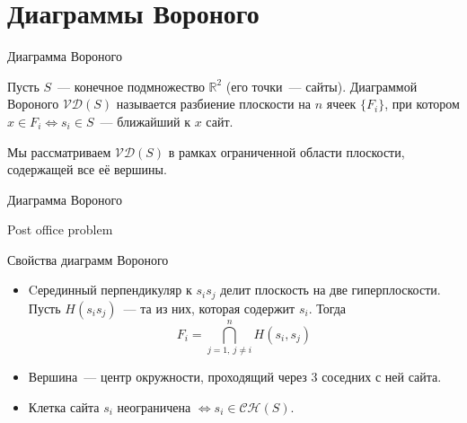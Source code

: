 \section{Диаграммы Вороного}

    \begin{frame}{Диаграмма Вороного}

        \begin{defn}

            Пусть $S$~--- конечное подмножество $\mathbb{R}^2$ (его точки~--- \alert{сайты}).
            Диаграммой Вороного $\mathcal{V}\mathcal{D}(S)$ называется разбиение плоскости на $n$ ячеек $\{ F_i \}$, при котором $x \in F_i
            \Leftrightarrow s_i \in S$~--- ближайший к $x$ \alert{сайт}.

        \end{defn}

        Мы рассматриваем $\mathcal{V}\mathcal{D}(S)$ в рамках ограниченной области плоскости, содержащей все её
        вершины.

    \end{frame}

    \begin{frame}{Диаграмма Вороного}
        
        \begin{center}


        \end{center}

        
    \end{frame}

    \begin{frame}{Post office problem}
    \vspace{-17.5mm}
    \begin{center}


    \end{center}

    \end{frame}

    \begin{frame}{Свойства диаграмм Вороного}

        \begin{itemize}

            \item Cерединный перпендикуляр к $s_i s_j$ делит плоскость на две гиперплоскости. Пусть $H(s_i s_j)$~--- та из них, которая содержит $s_i$.
                  Тогда
                  \[ F_i = \bigcap\limits_{j = 1, \ j \neq i}^{n} H(s_i, s_j)\]

            \item Вершина~--- центр окружности, проходящий через 3 соседних с ней сайта.

            \item Клетка сайта $s_i$ неограничена $\Leftrightarrow s_i \in \mathcal{C}\mathcal{H}(S)$.

        \end{itemize}

    \end{frame}

